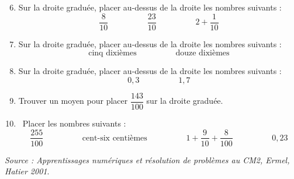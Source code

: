 \begin{activite}
            \begin{enumerate}
                \setcounter{enumi}{5}
                \item Sur la droite graduée, placer au-dessus de la droite les nombres suivants :
                $$\dfrac{8}{10} \hspace{2cm} \dfrac{23}{10} \hspace{2cm} 2+\dfrac{1}{10}$$
                \item Sur la droite graduée, placer au-dessus de la droite les nombres suivants :
                $$\text{cinq dixièmes} \hspace{2cm} \text{douze dixièmes}$$
                \item Sur la droite graduée, placer au-dessus  de la droite les nombres suivants :
                $$0,3 \hspace{2cm} 1,7$$
                \item Trouver un moyen pour placer $\dfrac{143}{100}$ sur la droite graduée. \\
                \item \, Placer les nombres suivants :
                $$\dfrac{255}{100} \hspace{2cm} \text{cent-six centièmes} \hspace{2cm} 1+\dfrac{9}{10}+\dfrac{8}{100} \hspace{2cm} 0,23$$
            \end{enumerate}

    \vfill\hfill{\it\footnotesize Source : Apprentissages numériques et résolution de problèmes au CM2, Ermel, Hatier 2001}.
\end{activite}